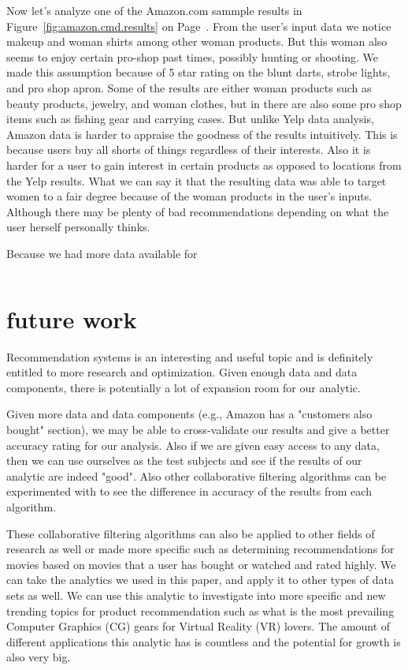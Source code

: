 \documentclass[conference]{IEEEtran}
\begin{document}
Now let's analyze one of the Amazon.com sammple results in Figure~\ref{fig:amazon.cmd.results} on Page~\pageref{fig:amazon.cmd.results}. From the user's input data we notice makeup and woman shirts among other woman products. But this woman also seems to enjoy certain pro-shop past times, possibly hunting or shooting.  We made this assumption because of 5 star rating on the blunt darts, strobe lights, and pro shop apron. Some of the results are either woman products such as beauty products, jewelry, and woman clothes, but in there are also some pro shop items such as fishing gear and carrying cases.  But unlike Yelp data analysis, Amazon data is harder to appraise the goodness of the results intuitively.  This is because users buy all shorts of things regardless of their interests.  Also it is harder for a user to gain interest in certain products as opposed to locations from the Yelp results.  What we can say it that the resulting data was able to target women to a fair degree because of the woman products in the user's inputs.  Although there may be plenty of bad recommendations depending on what the user herself personally thinks.

Because we had more data available for 

\begin{lstlisting}
\end{lstlisting}


\section{future work}
Recommendation systems is an interesting and useful topic and is definitely entitled to more research and optimization.  Given enough data and data components, there is potentially a lot of expansion room for our analytic.  

Given more data and data components (e.g., Amazon has a "customers also bought" section), we may be able to cross-validate our results and give a better accuracy rating for our analysis.  Also if we are given easy access to any data, then we can use ourselves as the test subjects and see if the results of our analytic are indeed "good".  Also other collaborative filtering algorithms can be experimented with to see the difference in accuracy of the results from each algorithm.  

These collaborative filtering algorithms can also be applied to other fields of research as well or made more specific such as determining recommendations for movies based on movies that a user has bought or watched and rated highly.  We can take the analytics we used in this paper, and apply it to other types of data sets as well.  We can use this analytic to investigate into more specific and new trending topics for product recommendation such as what is the most prevailing Computer Graphics (CG) gears for Virtual Reality (VR) lovers.  The amount of different applications this analytic has is countless and the potential for growth is also very big.
\end{document}
